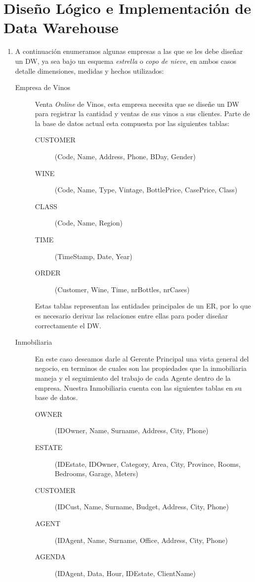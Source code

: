 \documentclass{article}
\begin{document}
\section{Diseño Lógico e Implementación de Data Warehouse}
\begin{enumerate}
	\item A continuación enumeramos algunas empresas a las que se les debe diseñar un DW, ya sea bajo un esquema \emph{estrella} o \emph{copo de nieve}, en ambos casos detalle dimensiones, medidas y hechos utilizados:
\begin{description}
    \item[Empresa de Vinos] Venta \emph{Online} de Vinos, esta empresa necesita que se diseñe 
    un DW para registrar la cantidad y ventas de sus vinos a sus clientes.
    Parte de la base de datos actual esta compuesta por las siguientes tablas:
    \begin{description}
	    \item [CUSTOMER] (Code, Name, Address, Phone, BDay, Gender)
	    \item [WINE] (Code, Name, Type, Vintage, BottlePrice, CasePrice, Class)
	    \item [CLASS] (Code, Name, Region)
	    \item [TIME] (TimeStamp, Date, Year)
	    \item [ORDER] (Customer, Wine, Time, nrBottles, nrCases)
	\end{description}
  Estas tablas representan las entidades principales de un ER, por lo que es necesario derivar las relaciones entre ellas para poder diseñar correctamente el DW.
  \item[Inmobiliaria] En este caso deseamos darle al Gerente Principal una vista general del negocio, en terminos de cuales son las propiedades que la inmobiliaria maneja y el seguimiento del trabajo de cada Agente dentro de la empresa. Nuestra Inmobiliaria cuenta con las siguientes tablas en su base de datos.
  \begin{description}
  		\item[OWNER] (IDOwner, Name, Surname, Address, City, Phone)
		\item[ESTATE](IDEstate, IDOwner, Category, Area, City, Province, Rooms, Bedrooms, Garage, Meters)
		\item[CUSTOMER] (IDCust, Name, Surname, Budget, Address, City, Phone)
		\item[AGENT] (IDAgent, Name, Surname, Office, Address, City, Phone)
		\item[AGENDA] (IDAgent, Data, Hour, IDEstate, ClientName)

\end{description}
\end{description}
\end{enumerate}
\end{document}
